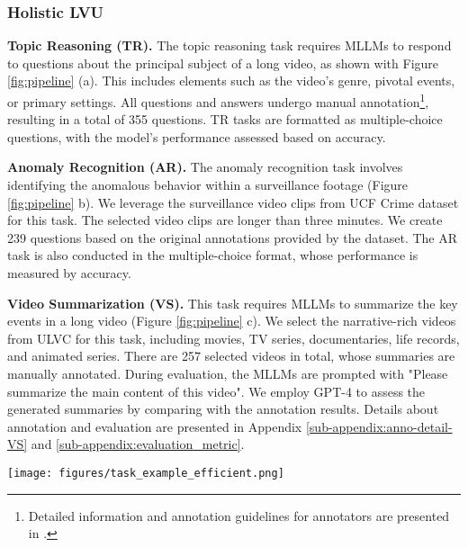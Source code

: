 \subsubsection{Holistic LVU}
\textbf{Topic Reasoning (TR).} The topic reasoning task requires MLLMs to respond to questions about the principal subject of a long video, as shown with Figure \ref{fig:pipeline} (a). This includes elements such as the video's genre, pivotal events, or primary settings. %
All questions and answers undergo manual annotation\footnote{Detailed information and annotation guidelines for annotators are presented in .}, resulting in a total of 355 questions. TR tasks are formatted as multiple-choice questions, with the model's performance assessed based on accuracy.  

\noindent\textbf{Anomaly Recognition (AR).} The anomaly recognition task involves identifying the anomalous behavior within a surveillance footage (Figure \ref{fig:pipeline} b). We leverage the surveillance video clips from UCF Crime dataset \cite{ucfcrime-2018} for this task. The selected video clips are longer than three minutes. We create 239 questions based on the original annotations provided by the dataset. The AR task is also conducted in the multiple-choice format, whose performance is measured by accuracy. 

\noindent\textbf{Video Summarization (VS).} This task requires MLLMs to summarize the key events in a long video (Figure \ref{fig:pipeline} c). We select the narrative-rich videos from ULVC for this task, including movies, TV series, documentaries, life records, and animated series. There are 257 selected videos in total, whose summaries are manually annotated. During evaluation, the MLLMs are prompted with "Please summarize the main content of this video". We employ GPT-4 to assess the generated summaries by comparing with the annotation results. Details about annotation and evaluation are presented in Appendix \ref{sub-appendix:anno-detail-VS} and \ref{sub-appendix:evaluation_metric}. 

\begin{figure*}[thp]
    \centering
    \texttt{[image: figures/task\_example\_efficient.png]}
    \caption{Examples of MLVU. There are nine tasks designed to evaluate the \textit{holistic}, \textit{single-detail}, and \textit{multi-detail LVU} capabilities of MLLMs. The MLLMs are asked to solve the problem (with the ground-truth answers marked in blue) based on the long video input and textual prompt. For multiple-choice questions, we set 4 candidates in the dev set and 6 candidates in the test set.} 
    \label{fig:pipeline}
\end{figure*}

